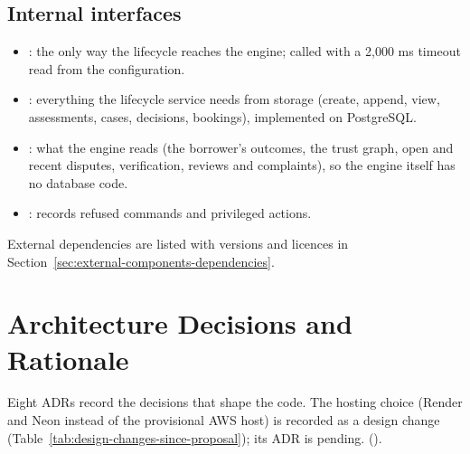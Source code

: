 \subsection{Internal interfaces}\label{sec:internal-interfaces}
\begin{itemize}
\item {}: the only way the lifecycle reaches the engine; called with a 2,000 ms timeout read from the configuration.
\item {}: everything the lifecycle service needs from storage (create, append, view, assessments, cases, decisions, bookings), implemented on PostgreSQL.
\item {}: what the engine reads (the borrower's outcomes, the trust graph, open and recent disputes, verification, reviews and complaints), so the engine itself has no database code.
\item {}: records refused commands and privileged actions.
\end{itemize}

External dependencies are listed with versions and licences in Section~\ref{sec:external-components-dependencies}.

\section{Architecture Decisions and Rationale}\label{sec:architecture-decisions-rationale}
Eight ADRs record the decisions that shape the code. The hosting choice (Render and Neon instead of the provisional AWS host) is recorded as a design change (Table~\ref{tab:design-changes-since-proposal}); its ADR is pending. ().


